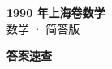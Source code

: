 \documentclass[zihao=-4, a4paper]{ctexart}
\begin{document}
\begin{center}
  {\Large\bfseries 1990 年上海卷数学}\\[4pt]
  {\large 数学 · 简答版}
\end{center}
\medskip
{}

\clearpage
{}
\begin{center}{\Large\bfseries 答案速查}\end{center}
\medskip

\end{document}
